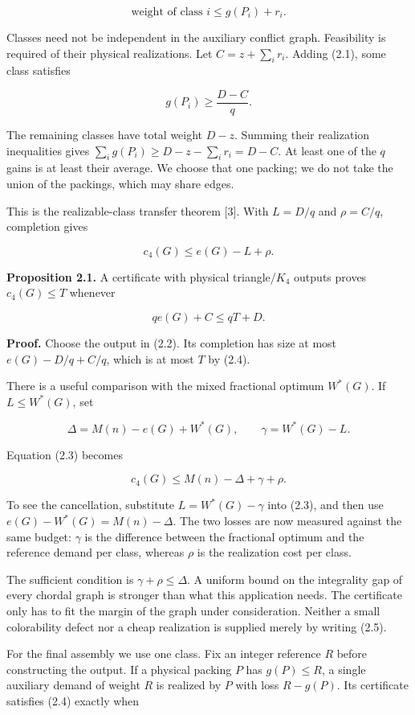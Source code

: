 \documentclass[english,11pt,a4paper]{article}
\begin{document}
\[
\text{weight of class }i\le g(P_i)+r_i.
\tag{2.1}
\]

Classes need not be independent in the auxiliary conflict graph.
Feasibility is required of their physical realizations. Let
\(C=z+\sum_i r_i\). Adding (2.1), some class satisfies

\[
g(P_i)\ge\frac{D-C}{q}.
\tag{2.2}
\]

The remaining classes have total weight \(D-z\). Summing their
realization inequalities gives \(\sum_i g(P_i)\ge D-z-\sum_i r_i=D-C\).
At least one of the \(q\) gains is at least their average. We choose
that one packing; we do not take the union of the packings, which may
share edges.

This is the realizable-class transfer theorem {[}3{]}. With \(L=D/q\)
and \(\rho=C/q\), completion gives

\[
c_4(G)\le e(G)-L+\rho.
\tag{2.3}
\]

\textbf{Proposition 2.1.} A certificate with physical triangle/\(K_4\)
outputs proves \(c_4(G)\le T\) whenever

\[
qe(G)+C\le qT+D.
\tag{2.4}
\]

\textbf{Proof.} Choose the output in (2.2). Its completion has size at
most \(e(G)-D/q+C/q\), which is at most \(T\) by (2.4).

There is a useful comparison with the mixed fractional optimum
\(W^*(G)\). If \(L\le W^*(G)\), set

\[
\Delta=M(n)-e(G)+W^*(G),\qquad
\gamma=W^*(G)-L.
\]

Equation (2.3) becomes

\[
c_4(G)\le M(n)-\Delta+\gamma+\rho.
\tag{2.5}
\]

To see the cancellation, substitute \(L=W^*(G)-\gamma\) into (2.3), and
then use \(e(G)-W^*(G)=M(n)-\Delta\). The two losses are now measured
against the same budget: \(\gamma\) is the difference between the
fractional optimum and the reference demand per class, whereas \(\rho\)
is the realization cost per class.

The sufficient condition is \(\gamma+\rho\le\Delta\). A uniform bound on
the integrality gap of every chordal graph is stronger than what this
application needs. The certificate only has to fit the margin of the
graph under consideration. Neither a small colorability defect nor a
cheap realization is supplied merely by writing (2.5).

For the final assembly we use one class. Fix an integer reference \(R\)
before constructing the output. If a physical packing \(P\) has
\(g(P)\le R\), a single auxiliary demand of weight \(R\) is realized by
\(P\) with loss \(R-g(P)\). Its certificate satisfies (2.4) exactly when
\end{document}
